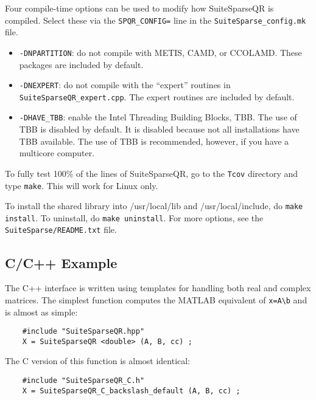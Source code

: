 \documentclass[12pt]{article}
\begin{document}
Four compile-time options can be used to modify how SuiteSparseQR is compiled.
Select these via the \verb'SPQR_CONFIG=' line in the \verb'SuiteSparse_config.mk' file.

\begin{itemize}

    \item \verb'-DNPARTITION': do not compile with METIS, CAMD, or CCOLAMD.
    These packages are included by default.

    \item \verb'-DNEXPERT': do not compile with the ``expert'' routines in
    \verb'SuiteSparseQR_expert.cpp'.  The expert routines are included by
    default.

    \item \verb'-DHAVE_TBB': enable the Intel Threading Building Blocks, TBB.
    The use of TBB is disabled by default.  It is disabled because not all
    installations have TBB available.  The use of TBB is recommended, however,
    if you have a multicore computer.

\end{itemize}

To fully test 100\% of the lines of SuiteSparseQR, go to the \verb'Tcov'
directory and type \verb'make'.  This will work for Linux only.

To install the shared library
into /usr/local/lib and /usr/local/include, do {\tt make install}.
To uninstall, do {\tt make uninstall}.
For more options, see the {\tt SuiteSparse/README.txt} file.

\subsection{C/C++ Example}

The C++ interface is written using templates for handling both real and complex
matrices.  The simplest function computes the MATLAB equivalent of
\verb'x=A\b' and is almost as simple:
{\footnotesize
\begin{verbatim}
    #include "SuiteSparseQR.hpp"
    X = SuiteSparseQR <double> (A, B, cc) ;
\end{verbatim}
}
The C version of this function is almost identical:
{\footnotesize
\begin{verbatim}
    #include "SuiteSparseQR_C.h"
    X = SuiteSparseQR_C_backslash_default (A, B, cc) ;
\end{verbatim}
}
\end{document}
